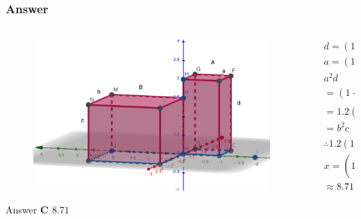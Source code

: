 \documentclass[
	11pt, %
]{beamer}
\begin{document}

\begin{frame}
	\frametitle{Answer}
	\framesubtitle{}
	\pause
	\begin{columns}[t] 
		\begin{column}{0.6\textwidth} %
			\begin{figure}
				\includegraphics[width=\linewidth]{Rectangular_Solid_Example_Question1_1.png}
			\end{figure}
			\pause
			Answer \textbf{C $8.71$}
		\end{column}
		\begin{column}{0.4\textwidth} %
			\pause
	     \begin{equation*}
					\begin{aligned}
					&d = (1 - 0.2)c = 1.2c\\
					&a = (1-\frac{x}{100})b\\
					&a^2 d \\
					&=(1-\frac{x}{100})^2b^21.2c\\
					&= 1.2(1-\frac{x}{100})^2b^2c\\
					&=b^2c\\
					&\therefore1.2(1-\frac{x}{100})^2=1\\
					&x = (1 - \sqrt{\frac{5}{6}}) \cdot 100\\
					&\approx 8.71\\
					\end{aligned}
				\end{equation*}	
		\end{column}
	\end{columns}
\end{frame}
\end{document}
